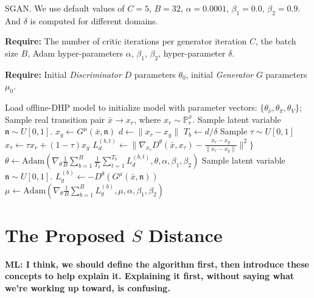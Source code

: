 \documentclass[letterpaper]{article} %
\begin{document}
\begin{algorithm}
    \caption{SGAN. We use default values of $C=5$, $B=32$, $\alpha=0.0001$, $\beta_1=0.0$, $\beta_2=0.9$. And $\delta$ is computed for different domains.}
    \label{sgan}

    \textbf{Require:} The number of critic iterations per generator iteration $C$, the batch size $B$, Adam hyper-parameters $\alpha$, $\beta_1$, $\beta_2$, hyper-parameter $\delta$.

    \textbf{Require:} Initial \textit{Discriminator} $D$ parameters $\theta_0$, initial \textit{Generator} $G$ parameters $\mu_0$.
\begin{algorithmic}[1]
    \STATE Load offline-DHP model to initialize model with parameter vectors: $\{  \theta_{\hat{\nu}}, \theta_{\hat{\pi}}, \theta_{V} \}$;
                \STATE Sample real transition pair $\bar{x}\rightarrow x_r$, where $x_r \sim \mathbb{P}_r^{\bar{x}}$.
                \STATE Sample latent variable $\mathfrak{n} \sim U[0,1]$.
                \STATE $x_g\leftarrow G^{\mu}(\bar{x},\mathfrak{n})$
                \STATE $d \leftarrow \|x_r-x_g\|$
                \STATE $T_b \leftarrow d/\delta$
                    \STATE Sample $\tau \sim U[0,1]$
                    \STATE $x_\tau \leftarrow \tau x_{r} + (1-\tau) x_g$
                    \STATE $L_d^{(b,t)} \leftarrow \|\nabla_{x_{\tau}}D^{\theta}(\bar{x},x_{\tau})-\frac{x_{r}-x_{g}}{\|x_{r}-x_{g}\|}\|^2 \}$
                \ENDFOR
            \ENDFOR
            \STATE $\theta \leftarrow \textrm{Adam}(\nabla_{\theta}\frac{1}{B}\sum_{b=1}^{B}\frac{1}{T_b}\sum_{t=1}^{T_b}L_d^{(b,t)}, \theta, \alpha, \beta_1, \beta_2)$
        \ENDFOR
            \STATE Sample latent variable $\mathfrak{n} \sim U[0,1]$.
            \STATE $L_g^{(b)} \leftarrow -D^{\theta}(G^{\mu}(\bar{x},\mathfrak{n}))$
        \ENDFOR
        \STATE $\mu \leftarrow \textrm{Adam}(\nabla_{\theta}\frac{1}{B}\sum_{b=1}^{B}L_g^{(b)}, \mu, \alpha, \beta_1, \beta_2)$
    \ENDWHILE
\end{algorithmic}
\end{algorithm}

\section{The Proposed $S$ Distance}

{\bf ML: I think, we should define the algorithm first, then introduce these concepts to help explain it. Explaining it first, without saying what we're working up toward, is confusing.}
\end{document}
